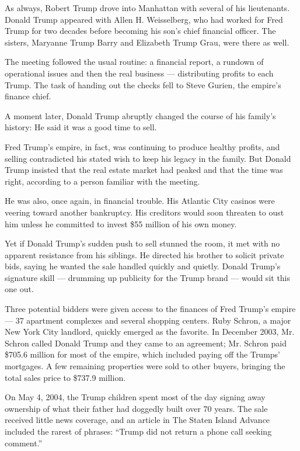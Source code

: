 As always, Robert Trump drove into Manhattan with several of his
lieutenants. Donald Trump appeared with Allen H. Weisselberg, who had
worked for Fred Trump for two decades before becoming his son's chief
financial officer. The sisters, Maryanne Trump Barry and Elizabeth Trump
Grau, were there as well.

The meeting followed the usual routine: a financial report, a rundown of
operational issues and then the real business --- distributing profits
to each Trump. The task of handing out the checks fell to Steve Gurien,
the empire's finance chief.

A moment later, Donald Trump abruptly changed the course of his family's
history: He said it was a good time to sell.

Fred Trump's empire, in fact, was continuing to produce healthy profits,
and selling contradicted his stated wish to keep his legacy in the
family. But Donald Trump insisted that the real estate market had peaked
and that the time was right, according to a person familiar with the
meeting.

He was also, once again, in financial trouble. His Atlantic City casinos
were veering toward another bankruptcy. His creditors would soon
threaten to oust him unless he committed to invest \$55 million of his
own money.

Yet if Donald Trump's sudden push to sell stunned the room, it met with
no apparent resistance from his siblings. He directed his brother to
solicit private bids, saying he wanted the sale handled quickly and
quietly. Donald Trump's signature skill --- drumming up publicity for
the Trump brand --- would sit this one out.

Three potential bidders were given access to the finances of Fred
Trump's empire --- 37 apartment complexes and several shopping centers.
Ruby Schron, a major New York City landlord, quickly emerged as the
favorite. In December 2003, Mr. Schron called Donald Trump and they came
to an agreement; Mr. Schron paid \$705.6 million for most of the empire,
which included paying off the Trumps' mortgages. A few remaining
properties were sold to other buyers, bringing the total sales price to
\$737.9 million.

On May 4, 2004, the Trump children spent most of the day signing away
ownership of what their father had doggedly built over 70 years. The
sale received little news coverage, and an article in The Staten Island
Advance included the rarest of phrases: ``Trump did not return a phone
call seeking comment.''

